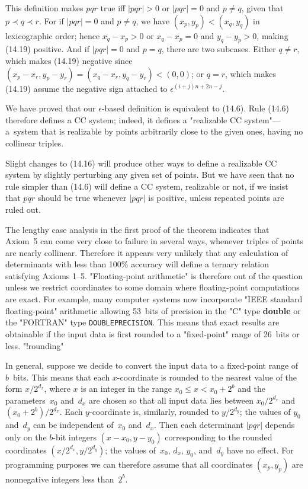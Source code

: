 This definition makes $pqr$ true iff $\vert pqr\vert>0$ or $\vert
pqr\vert=0$ and $p\neq q$, given that $p\prec q\prec r$. For if $\vert
pqr\vert=0$ and $p\neq q$, we have $(x_p,y_p)<(x_q,y_q)$ in
lexicographic order; hence $x_q-x_p>0$ or $x_q-x_p=0$ and $y_q-y_p>0$,
making (14.19) positive. And if $\vert pqr\vert=0$ and $p=q$, there
are two subcases. Either
$q\neq r$, which makes (14.19) negative since
$(x_p-x_r,y_p-y_r)=(x_q-x_r,y_q-y_r)<(0,0)$; or $q=r$, which makes
(14.19) assume the negative sign attached to $\epsilon^{(i+j)n+2n-j}$.

We have proved that our $\epsilon$-based definition is equivalent to
(14.6). Rule (14.6) therefore defines a CC system; indeed, it defines
a "realizable CC system"---a~system that is realizable by points
arbitrarily close to the given ones, having no collinear
triples.\quad\pfbox

\bigskip
Slight changes to (14.16) will produce other ways to define a
realizable CC system by slightly perturbing any given set of points.
But we have seen that no rule simpler than (14.6) will define a CC
system, realizable or not, if we insist that $pqr$ should be true
whenever $\vert pqr\vert$ is positive, unless repeated points are
ruled out.

The lengthy case analysis in the first proof of the theorem indicates that
Axiom~5 can come very close to failure in several ways, whenever triples of
points are nearly collinear. Therefore it appears very unlikely that
any calculation of determinants with less than 100\% accuracy will
define a ternary relation satisfying Axioms 1--5. "Floating-point
arithmetic" is therefore out of the question unless we restrict
coordinates to some domain where floating-point computations are
 exact. For example,
many computer systems now incorporate "IEEE standard
floating-point" arithmetic allowing 53~bits of precision in the {\ninerm"C"}
type {\bf double} or the {\ninerm"FORTRAN"} type {\tt DOUBLEPRECISION}. This
means that exact results are obtainable if the input data is first
rounded to a "fixed-point" range of 26~bits or less. "!rounding"

In general, suppose we decide to convert the input data to a
fixed-point range of $b$~bits. This means that each $x$-coordinate is
rounded to the nearest value of the form $x/2^{d_x}$, where $x$ is an
integer in the range $x_0\leq x<x_0+2^b$ and the parameters~$x_0$
and~$d_x$ are chosen so that all input data lies between $x_0/2^{d_x}$
and $(x_0+2^b)/2^{d_x}$. Each $y$-coordinate is, similarly, rounded to
$y/2^{d_y}$; the values of $y_0$ and~$d_y$ can be independent of~$x_0$
and~$d_x$. Then each determinant $\vert pqr\vert$ depends only on the
$b$-bit integers $(x-x_0,y-y_0)$ corresponding to the rounded
coordinates $(x/2^{d_x},y/2^{d_y})$; the values of~$x_0$, $d_x$,
$y_0$, and~$d_y$ have no effect. For programming purposes we can
therefore assume that all coordinates $(x_p,y_p)$ are nonnegative
integers less than~$2^b$.

